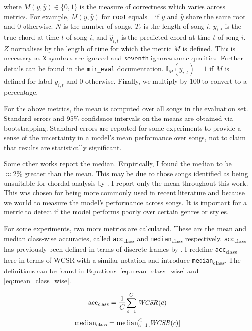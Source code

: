 where $M(y, \hat{y})\in\{0,1\}$ is the measure of correctness which varies across metrics. For example, $M(y, \hat{y})$ for \texttt{root} equals $1$ if $y$ and $\hat{y}$ share the same root and $0$ otherwise. $N$ is the number of songs, $T_i$ is the length of song $i$, $y_{i,t}$ is the true chord at time $t$ of song $i$, and $\hat{y}_{i,t}$ is the predicted chord at time $t$ of song $i$. $Z$ normalises by the length of time for which the metric $M$ is defined. This is necessary as \texttt{X} symbols are ignored and \texttt{seventh} ignores some qualities. Further details can be found in the \texttt{mir\_eval} documentation. $\mathbb{I}_M(y_{i,t})=1$ if $M$ is defined for label $y_{i,t}$ and $0$ otherwise. Finally, we multiply by 100 to convert to a percentage.

For the above metrics, the mean is computed over all songs in the evaluation set. Standard errors and 95\% confidence intervals on the means are obtained via bootstrapping. Standard errors are reported for some experiments to provide a sense of the uncertainty in a model's mean performance over songs, not to claim that results are statistically significant.

Some other works report the median. Empirically, I found the median to be $\approx 2\%$ greater than the mean. This may be due to those songs identified as being unsuitable for chordal analysis by \citet{FourTimelyInsights}. I report only the mean throughout this work. This was chosen for being more commonly used in recent literature and because we would to measure the model's performance across songs. It is important for a metric to detect if the model performs poorly over certain genres or styles.

For some experiments, two more metrics are calculated. These are the mean and median class-wise accuracies, called \texttt{acc}\textsubscript{class} and \texttt{median}\textsubscript{class} respectively. \texttt{acc}\textsubscript{class} has previously been defined in terms of discrete frames by \citet{ACRLargeVocab1}. I redefine \texttt{acc}\textsubscript{class} here in terms of WCSR with a similar notation and introduce \texttt{median}\textsubscript{class}. The definitions can be found in Equations~\ref{eq:mean_class_wise} and \ref{eq:mean_class_wise}.

\begin{equation}\label{eq:mean_class_wise}
    \text{acc}\textsubscript{class} = \frac{1}{C} \sum_{c=1}^{C} \text{\emph{WCSR}}(c)
\end{equation}
\begin{equation}\label{eq:median_class_wise}
    \text{median}\textsubscript{class} = \text{median}_{c=1}^{C} [\text{\emph{WCSR}}(c)]
\end{equation}

